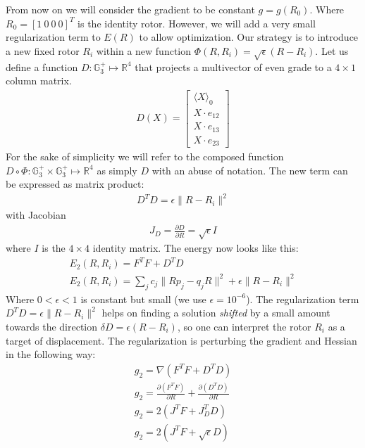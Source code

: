 \documentclass{birkjour}
\numberwithin{equation}{section}
\begin{document}
From now on we will consider the gradient to be constant $g = g(R_0)$. Where $R_0 = [1 \ 0 \ 0 \ 0]^T$ is the identity rotor. However, we will add a very small regularization term to $E(R)$ to allow optimization. Our strategy is to introduce a new fixed rotor $R_i$ within a new function $\Phi(R, R_i) = \sqrt{\epsilon} (R - R_i)$. Let us define a function $D : \mathbb{G}^{+}_3 \mapsto \mathbb{R}^4$ that projects a multivector of even grade to a $4\times1$ column matrix.
\begin{eqnarray*}
D(X) = 
\left[\begin{array}{c} \langle X \rangle_0 \\ X \cdot e_{12} \\ X \cdot e_{13} \\ X \cdot e_{23}\end{array}\right]
\end{eqnarray*}
For the sake of simplicity we will refer to the composed function $D \circ \Phi:\mathbb{G}^{+}_3 \times \mathbb{G}^{+}_3 \mapsto \mathbb{R}^4$ as simply $D$ with an abuse of notation. The new term can be expressed as matrix product:
\begin{eqnarray*}
D^T D = \epsilon \|R - R_i\|^2
\end{eqnarray*}
with Jacobian 
\begin{eqnarray*}
J_D = \frac{\partial D}{\partial R} = \sqrt{\epsilon} I
\end{eqnarray*}
where $I$ is the $4\times4$ identity matrix. The energy now looks like this:
\begin{eqnarray*}
E_2(R, R_i) = F^T F + D^T D\\
E_2(R, R_i) = \sum_j { c_{j} \|R p_j - q_j R\|^2 } + \epsilon \|R - R_i\|^2
\end{eqnarray*}
Where $0 < \epsilon < 1$ is constant but small (we use $\epsilon = 10^{-6}$). The regularization term $D^T D = \epsilon \|R - R_i\|^2$ helps on finding a solution \emph{shifted} by a small amount towards the direction $\delta D = \epsilon (R - R_i)$, so one can interpret the rotor $R_i$ as a target of displacement. The regularization is perturbing the gradient and Hessian in the following way:
\begin{eqnarray*}
g_2 = \nabla(F^T F + D^T D)\\
g_2 = \frac{\partial (F^T F)}{\partial R} + \frac{\partial (D^T D)}{\partial R}\\
g_2 = 2 (J^T F + J_D^T D)\\
g_2 = 2 (J^T F + \sqrt{\epsilon} D)
\end{eqnarray*}
\end{document}
